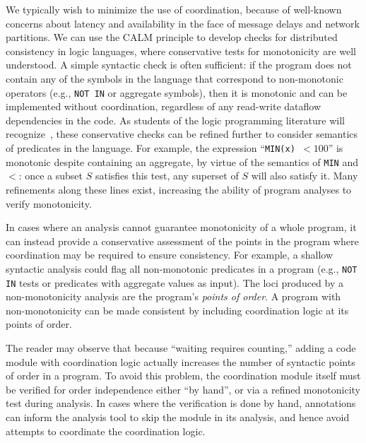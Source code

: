 We typically wish to minimize the use of coordination, because of well-known
concerns about latency and availability in the face of message delays and
network partitions.  We can use the CALM principle to develop checks for
distributed consistency in logic languages, where conservative tests for
monotonicity are well understood. A simple syntactic check is often sufficient:
if the program does not contain any of the symbols in the language that
correspond to non-monotonic operators (e.g., \texttt{NOT IN} or aggregate
symbols), then it is monotonic and can be implemented without coordination,
regardless of any read-write dataflow dependencies in the code.  As students of the logic programming literature will recognize~\cite{local-strat,ross-modular,ross-strat}, these conservative
checks can be refined further to consider semantics of predicates in the
language. For example, the expression ``\texttt{MIN(x) $< 100$}'' is monotonic
despite containing an aggregate, by virtue of the semantics of \texttt{MIN} and
$<$: once a subset $S$ satisfies this test, any superset of $S$ will also
satisfy it.  Many refinements along these lines exist, increasing the ability
of program analyses to verify monotonicity.
% 

In cases where an analysis cannot guarantee monotonicity of a whole program, it
can instead provide a conservative assessment of the points in the program where
coordination may be required to ensure consistency.  For example, a shallow
syntactic analysis could flag all non-monotonic predicates in a program (e.g.,
\texttt{NOT IN} tests or predicates with aggregate values as input). The loci
produced by a non-monotonicity analysis are the program's \emph{points of order}. A program
with non-monotonicity can be made consistent by including coordination logic at
its points of order.

The reader may observe that because ``waiting requires counting,'' adding a code module with coordination logic actually increases the number of syntactic points of order in a program.  To avoid this problem, the coordination module itself must be verified for order independence either ``by hand'', or via a refined monotonicity test during analysis.  In cases where the verification is done by hand, annotations can inform the analysis tool to skip the module in its analysis, and hence avoid attempts to coordinate the coordination logic.  

